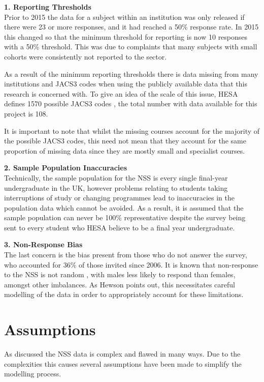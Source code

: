 \documentclass[11pt,a4paper]{report}
\begin{document}
\textbf{1. Reporting Thresholds} \\
Prior to 2015 the data for a subject within an institution was only released if there were 23 or more responses, and it had reached a 50\% response rate. In 2015 this changed so that the minimum threshold for reporting is now 10 responses with a 50\% threshold. This was due to complaints that many subjects with small cohorts were consistently not reported to the sector. 

As a result of the minimum reporting thresholds there is data missing from many institutions and JACS3 codes when using the publicly available data that this research is concerned with. To give an idea of the scale of this issue, HESA defines 1570 possible JACS3 codes \cite{HESAJACS3}, the total number with data available for this project is 108.

It is important to note that whilst the missing courses account for the majority of the possible JACS3 codes, this need not mean that they account for the same proportion of missing data since they are mostly small and specialist courses. 

\textbf{2. Sample Population Inaccuracies}\\ Technically, the sample population for the \ac{NSS} is every single final-year undergraduate in the UK, however problems relating to students taking interruptions of study or changing programmes lead to inaccuracies in the population data which cannot be avoided. As a result, it is assumed that the sample population can never be 100\% representative despite the survey being sent to every student who \ac{HESA} believe to be a final year undergraduate.

\textbf{3. Non-Response Bias}\\ The last concern is the bias present from those who do not answer the survey, who accounted for 36\% of those invited since 2006. It is known that non-response to the NSS is not random \cite{hewson2011implications}, with males less likely to respond than females, amongst other imbalances. As Hewson points out, this necessitates careful modelling of the data in order to appropriately account for these limitations.

\section{Assumptions}
As discussed the NSS data is complex and flawed in many ways. Due to the complexities this causes several assumptions have been made to simplify the modelling process.
\end{document}
